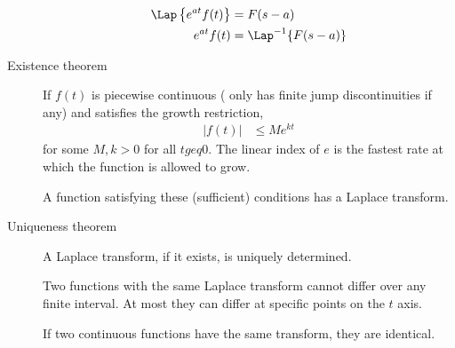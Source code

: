 \begin{description}
        \begin{align}
            \Lap\left\{ e^{at} f(t) \right\} & = F(s-a)              \\
            e^{at} f(t)                      & = \Lap^{-1}\{F(s-a)\}
        \end{align}
    \item[Existence theorem] If $ f(t) $ is piecewise continuous ( only has
        finite jump discontinuities if any) and satisfies the growth restriction,
        \begin{align}
            |f(t)| & \leq Me^{kt}
        \end{align}
        for some $ M, k >0 $ for all $ t geq 0 $. The linear index of $ e $ is the
        fastest rate at which the function is allowed to grow. \par
        A function satisfying these (sufficient) conditions has a Laplace transform.
    \item[Uniqueness theorem] A Laplace transform, if it exists, is uniquely determined.
        \par
        Two functions with the same Laplace transform cannot differ over any finite
        interval. At most they can differ at specific points on the $ t $ axis. \par
        If two continuous functions have the same transform, they are identical.
\end{description}

